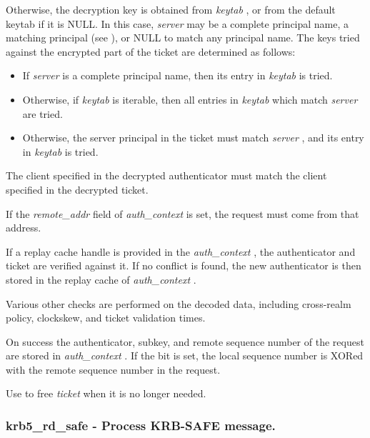 \documentclass[letterpaper,10pt,english]{sphinxmanual}
\begin{document}
Otherwise, the decryption key is obtained from \emph{keytab} , or from the default keytab if it is NULL. In this case, \emph{server} may be a complete principal name, a matching principal (see {\hyperref[appdev/refs/api/krb5_sname_match:c.krb5_sname_match]{}} ), or NULL to match any principal name. The keys tried against the encrypted part of the ticket are determined as follows:
\begin{itemize}
\item {} 
If \emph{server} is a complete principal name, then its entry in \emph{keytab} is tried.

\item {} 
Otherwise, if \emph{keytab} is iterable, then all entries in \emph{keytab} which match \emph{server} are tried.

\item {} 
Otherwise, the server principal in the ticket must match \emph{server} , and its entry in \emph{keytab} is tried.

\end{itemize}

The client specified in the decrypted authenticator must match the client specified in the decrypted ticket.

If the \emph{remote\_addr} field of \emph{auth\_context} is set, the request must come from that address.

If a replay cache handle is provided in the \emph{auth\_context} , the authenticator and ticket are verified against it. If no conflict is found, the new authenticator is then stored in the replay cache of \emph{auth\_context} .

Various other checks are performed on the decoded data, including cross-realm policy, clockskew, and ticket validation times.

On success the authenticator, subkey, and remote sequence number of the request are stored in \emph{auth\_context} . If the {\hyperref[appdev/refs/macros/AP_OPTS_MUTUAL_REQUIRED:AP_OPTS_MUTUAL_REQUIRED]{}} bit is set, the local sequence number is XORed with the remote sequence number in the request.

Use {\hyperref[appdev/refs/api/krb5_free_ticket:c.krb5_free_ticket]{}} to free \emph{ticket} when it is no longer needed.


\subsubsection{krb5\_rd\_safe -  Process KRB-SAFE message.}
\label{appdev/refs/api/krb5_rd_safe:krb5-rd-safe-process-krb-safe-message}\label{appdev/refs/api/krb5_rd_safe::doc}
\end{document}
